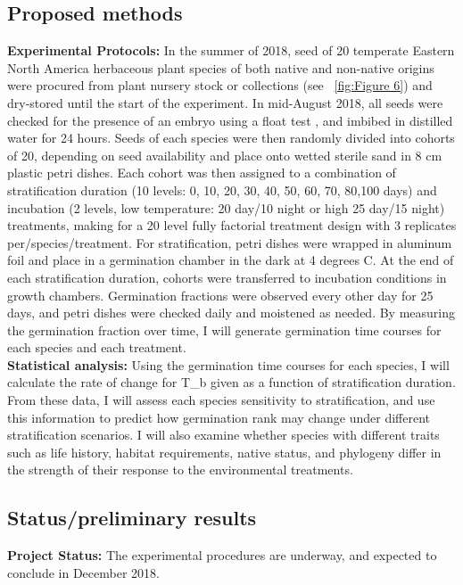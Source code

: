 \documentclass{article}\usepackage[]{graphicx}\usepackage[]{color}
\begin{document}
\subsection*{Proposed methods}
\indent\indent\textbf{Experimental Protocols:} In the summer of 2018, seed of 20 temperate Eastern North America herbaceous plant species of both native and non-native origins were procured from plant nursery stock or collections (see ~\ref{fig:Figure 6}) and dry-stored until the start of the experiment. In mid-August 2018, all seeds were checked for the presence of an embryo using a float test \citep{Baskin2014}, and imbibed in distilled water for 24 hours. Seeds of each species were then randomly divided into cohorts of 20, depending on seed availability and place onto wetted sterile sand in 8 cm plastic petri dishes. Each cohort was then assigned to a combination of stratification duration (10 levels: 0, 10, 20, 30, 40, 50, 60, 70, 80,100 days) and incubation (2 levels, low temperature: 20 day/10 night or high 25 day/15 night) treatments, making for a 20 level fully factorial treatment design with 3 replicates per/species/treatment. For stratification, petri dishes were wrapped in aluminum foil and place in a germination chamber in the dark at 4 degrees C. At the end of each stratification duration, cohorts were transferred to incubation conditions in growth chambers. Germination fractions were observed every other day for 25 days, and petri dishes were checked daily and moistened as needed. By measuring the germination fraction over time, I will generate germination time courses for each species and each treatment.\\
\textbf{Statistical analysis:} Using the germination time courses for each species, I will calculate the rate of change for T_b given as a function of stratification duration. From these data, I will assess each species sensitivity to stratification, and use this information to predict how germination rank may change under different stratification scenarios. I will also examine whether species with different traits such as life history, habitat requirements, native status, and phylogeny differ in the strength of their response to the environmental treatments.\\
\subsection*{Status/preliminary results}
\textbf{Project Status:} The experimental procedures are underway, and expected to conclude in December 2018.\\
\end{document}
